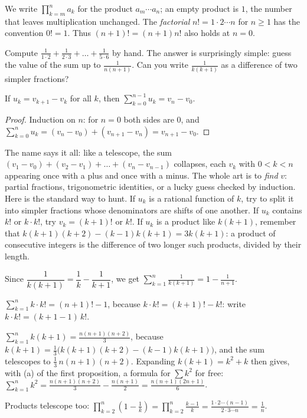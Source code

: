 We write $\prod_{k=m}^n a_k$ for the product $a_m\cdots a_n$; an empty product is $1$, the number that leaves multiplication unchanged. The \emph{factorial} $n!=1\cdot2\cdots n$ for $n\ge1$ has the convention $0!=1$. Thus $(n+1)!=(n+1)n!$ also holds at $n=0$.


\begin{think}
Compute $\frac1{1\cdot2}+\frac1{2\cdot3}+\dots+\frac1{5\cdot6}$ by hand. The answer is surprisingly simple: guess the value of the sum up to $\frac1{n(n+1)}$. Can you write $\frac1{k(k+1)}$ as a difference of two simpler fractions?
\end{think}

\begin{proposition}\label{prop:telescope}
If $u_k=v_{k+1}-v_k$ for all $k$, then $\displaystyle\sum_{k=0}^{n-1}u_k=v_n-v_0$.
\end{proposition}
\begin{proof}
Induction on $n$: for $n=0$ both sides are $0$, and $\sum_{k=0}^{n}u_k=(v_n-v_0)+(v_{n+1}-v_n)=v_{n+1}-v_0$.
\end{proof}

The name says it all: like a telescope, the sum $(v_1-v_0)+(v_2-v_1)+\dots+(v_n-v_{n-1})$ collapses, each $v_k$ with $0<k<n$ appearing once with a plus
and once with a minus. The whole art is to \emph{find} $v$: partial fractions, trigonometric identities, or a lucky guess checked by induction. Here is
the standard way to hunt. If $u_k$ is a rational function of $k$, try to split it into simpler fractions whose denominators are shifts of one
another. If $u_k$ contains $k!$ or $k\cdot k!$, try $v_k=(k+1)!$ or $k!$. If $u_k$ is a product like $k(k+1)$, remember that $k(k+1)(k+2)-(k-1)k(k+1)=3k(k+1)$:
a product of consecutive integers is the difference of two longer such products, divided by their length.

\begin{example}
Since $\dfrac{1}{k(k+1)}=\dfrac1k-\dfrac1{k+1}$, we get $\displaystyle\sum_{k=1}^n\frac1{k(k+1)}=1-\frac1{n+1}$.
\end{example}

\begin{examplex}
$\sum_{k=1}^nk\cdot k!=(n+1)!-1$, because $k\cdot k!=(k+1)!-k!$: write $k\cdot k!=(k+1-1)\,k!$.

$\sum_{k=1}^nk(k+1)=\frac{n(n+1)(n+2)}3$, because $k(k+1)=\frac13\bigl(k(k+1)(k+2)-(k-1)k(k+1)\bigr)$, and the sum telescopes to
$\frac13\,n(n+1)(n+2)$. Expanding $k(k+1)=k^2+k$ then gives, with (a) of the first proposition, a formula for $\sum k^2$ for free:
$\sum_{k=1}^nk^2=\frac{n(n+1)(n+2)}3-\frac{n(n+1)}2=\frac{n(n+1)(2n+1)}6$.

Products telescope too: $\prod_{k=2}^n\left(1-\frac1k\right)=\prod_{k=2}^n\frac{k-1}k=\frac{1\cdot2\cdots(n-1)}{2\cdot3\cdots n}=\frac1n$.
\end{examplex}

